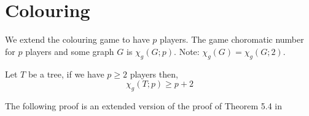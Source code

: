 \chapter{Colouring}


\begin{definition}
    We extend the colouring game to have $p$ players. The game choromatic number for $p$ players and some graph $G$ is $\chi_g(G;p)$. Note: $\chi_g(G) = \chi_g(G;2)$.
\end{definition}

\begin{theorem}
    Let $T$ be a tree, if we have $p \geq 2$ players then,
    \[\chi_g(T;p) \geq p + 2 \]
\end{theorem}

The following proof is an extended version of the proof of Theorem 5.4 in \cite[Bodlaender 1990]{bodlander1990}


